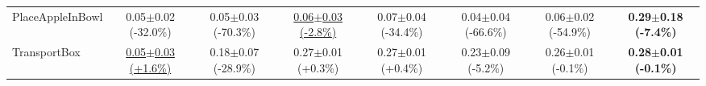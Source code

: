 \begin{table}[htbp]
\begin{adjustbox}{max width=\textwidth}
\begin{tabular}{l*{7}{c}}
PlaceAppleInBowl & 0.05$\pm$0.02 \scriptsize{(-32.0\%)} & 0.05$\pm$0.03 \scriptsize{(-70.3\%)} & \underline{0.06$\pm$0.03 \scriptsize{(-2.8\%)}} & 0.07$\pm$0.04 \scriptsize{(-34.4\%)} & 0.04$\pm$0.04 \scriptsize{(-66.6\%)} & 0.06$\pm$0.02 \scriptsize{(-54.9\%)} & \textbf{0.29$\pm$0.18 \scriptsize{(-7.4\%)}} \\
TransportBox & \underline{0.05$\pm$0.03 \scriptsize{(+1.6\%)}} & 0.18$\pm$0.07 \scriptsize{(-28.9\%)} & 0.27$\pm$0.01 \scriptsize{(+0.3\%)} & 0.27$\pm$0.01 \scriptsize{(+0.4\%)} & 0.23$\pm$0.09 \scriptsize{(-5.2\%)} & 0.26$\pm$0.01 \scriptsize{(-0.1\%)} & \textbf{0.28$\pm$0.01 \scriptsize{(-0.1\%)}} \\
\bottomrule
\end{tabular}
\end{adjustbox}
\end{table}

